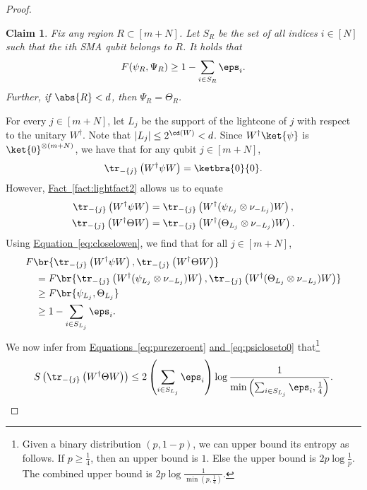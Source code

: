 \documentclass[11pt]{article}
\newcommand{\expref}[2]{\texorpdfstring{\hyperref[#2]{#1~\ref{#2}}}{#1~\ref{#2}}}
\newcommand{\expeqref}[2]{\texorpdfstring{\hyperref[#2]{#1~\eqref{#2}}}{#1~\eqref{#2}}}
\newtheorem{claim}[theorem]{Claim}
\begin{document}
\begin{proof}
\begin{claim}
\label{clm:gentlemeas}
Fix any region $R\subset [m+N]$. Let $S_R$ be the set of all indices $i\in [N]$ such that the $i$th SMA qubit belongs to $R$. It holds that 
%
%
\begin{align}
\label{eq:closelowen}
F(\psi_R,\Psi_R)\geq 1-\sum_{i\in S_R}\eps_i.
\end{align}
Further, if $\abs{R}<d$, then $\Psi_R=\Theta_R$.
\end{claim}
For every $j\in [m+N]$, let $L_j$ be the support of the lightcone of $j$ with respect to the unitary $W^{\dagger}$. Note that $|L_j|\leq 2^{\cd(W)} < d$. Since $W^{\dagger}\ket{\psi}$ is $\ket{0}^{\otimes(m+N)}$, we have that for any qubit $j\in [m+N]$,
\begin{align}
\label{eq:purezeroent}
    \tr_{-\{j\}} \left( W^\dagger \psi W \right) = \ketbra{0}{0}.
\end{align}
However, \expref{Fact}{fact:lightfact2} allows us to equate
\begin{align}
\tr_{- \{j\}} \left( W^\dagger \psi W \right) &= \tr_{- \{j\}} \left( W^\dagger (\psi_{L_j}\otimes \nu_{-L_j}) W \right), \\
\tr_{- \{j\}} \left( W^\dagger \Theta W \right) &= \tr_{- \{j\}} \left( W^\dagger (\Theta_{L_j}\otimes \nu_{-L_j}) W \right).
\end{align}
Using \expeqref{Equation}{eq:closelowen}, we find that for all $j \in [m+N]$,
\begin{align}
& F\br{\tr_{-\{j\}} \left( W^\dagger \psi W \right), \tr_{-\{j\}} \left(W^\dagger \Theta W \right)} \\
&\quad = F\br{ \tr_{-\{j\}} \left( W^\dagger (\psi_{L_j}\otimes \nu_{-L_j}) W \right), \tr_{-\{j\}} \left(W^\dagger (\Theta_{L_j}\otimes \nu_{-L_j}) W \right)} \\
&\quad \geq F\br{\psi_{L_j},\Theta_{L_j}} \\
&\quad \geq 1-\sum_{i\in S_{L_j}}\eps_i. \label{eq:psicloseto0}
\end{align}
We now infer from \expeqref{Equations}{eq:purezeroent} \expeqref{and}{eq:psicloseto0} that\footnote{Given a binary distribution $(p,1-p)$, we can upper bound its entropy as follows. If $p\geq \frac{1}{4}$, then an upper bound is $1$. Else the upper bound is $2p\log\frac{1}{p}$. The combined upper bound is $2p\log\frac{1}{\min(p,\frac{1}{4})}$.}
\begin{align}
    S \left( \tr_{-\{j\}} \left(W^\dagger \Theta W\right) \right) \leq  2\left(\sum_{i\in S_{L_j}}\eps_i\right)\log \frac{1}{\min\left(\sum_{i\in S_{L_j}}\eps_i, \frac{1}{4}\right)}.

\end{align}
\end{proof}
\end{document}
